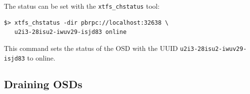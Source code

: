 \documentclass[a4paper,10pt]{book}
\begin{document}
The status can be set with the \texttt{xtfs\_chstatus} tool:

\begin{verbatim}
$> xtfs_chstatus -dir pbrpc://localhost:32638 \
   u2i3-28isu2-iwuv29-isjd83 online
\end{verbatim}

This command sets the status of the OSD with the UUID \texttt{u2i3-28isu2-iwuv29-isjd83} to online.

% 
% 
% 
% 
% 

\subsection{Draining OSDs}
\end{document}
